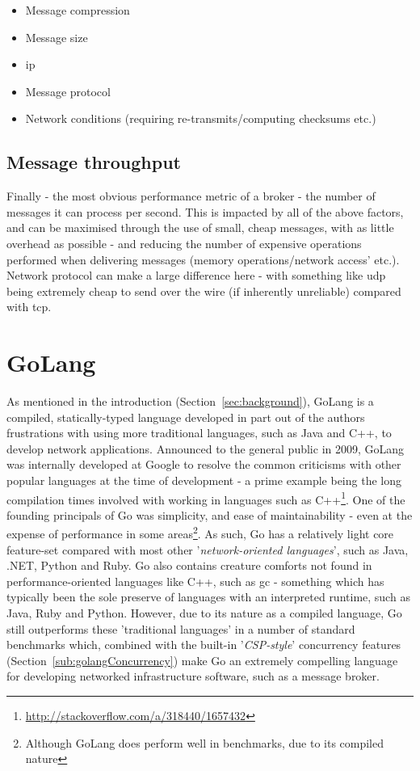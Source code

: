 \begin{itemize}
  \item Message compression
  \item Message size
  \item \gls{ip}
  \item Message protocol
  \item Network conditions (requiring re-transmits/computing checksums etc.)
\end{itemize}

\subsection{Message throughput}
\label{sub:Message throughput}

Finally - the most obvious performance metric of a broker - the number of
messages it can process per second. This is impacted by all of the above
factors, and can be maximised through the use of small, cheap messages, with as
little overhead as possible - and reducing the number of expensive operations
performed when delivering messages (memory operations/network access' etc.).
Network protocol can make a large difference here - with something like
\gls{udp} being extremely cheap to send over the wire (if inherently unreliable)
compared with \gls{tcp}.

\section{GoLang}
\label{sec:GoLang}

As mentioned in the introduction (Section~\ref{sec:background}), GoLang is a
compiled, statically-typed language developed in part out of the authors
frustrations with using more traditional languages, such as Java and C++, to
develop network applications\cite{kenThompsonInterview}. Announced to the
general public in 2009, GoLang was internally developed at Google to resolve the
common criticisms with other popular languages at the time of development - a
prime example being the long compilation times involved with working in
languages such as C++\footnote{\url{http://stackoverflow.com/a/318440/1657432}}.
One of the founding principals of Go was simplicity, and ease of
maintainability\cite{lessIsExponentiallyMore} - even at the expense of
performance in some areas\footnote{Although GoLang does perform well in
benchmarks, due to its compiled nature\cite{benchmarksGame}}. As such, Go has a
relatively light core feature-set compared with most other
'\emph{network-oriented languages}', such as Java, .NET, Python and Ruby. Go
also contains creature comforts not found in performance-oriented languages like
C++, such as \gls{gc} - something which has typically been the sole preserve of
languages with an interpreted runtime, such as Java, Ruby and Python. However,
due to its nature as a compiled language, Go still outperforms these
'traditional languages' in a number of standard benchmarks\cite{benchmarksGame}
which, combined with the built-in '\emph{CSP-style}'\cite{hoareCAR} concurrency
features (Section~\ref{sub:golangConcurrency}) make Go an extremely compelling
language for developing networked infrastructure software, such as a message
broker.

